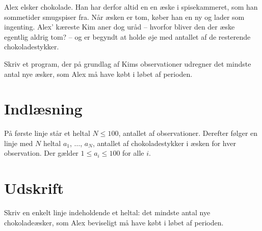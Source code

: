 Alex elsker chokolade.
Han har derfor altid en en æske i spisekammeret, som han sommetider smugspiser fra.
Når æsken er tom, køber han en ny og lader som ingenting.
Alex’ kæreste Kim aner dog uråd -- hvorfor bliver den der æske egentlig aldrig tom? -- og er begyndt at holde øje med antallet af de resterende chokoladestykker. 

Skriv et program, der på grundlag af Kims observationer udregner det mindste antal nye æsker, som Alex må have købt i løbet af perioden.

\section*{Indlæsning}

På første linje står et heltal $N \le 100$, antallet af observationer.
Derefter følger en linje med $N$ heltal $a_1$, $\ldots$, $a_N$, antallet af chokoladestykker i æsken for hver observation.
Der gælder $1\leq a_i\leq 100$ for alle $i$. 

\section*{Udskrift}
Skriv en enkelt linje indeholdende et heltal: det mindste antal nye chokoladeæsker, som Alex beviseligt må have købt i løbet af perioden.
